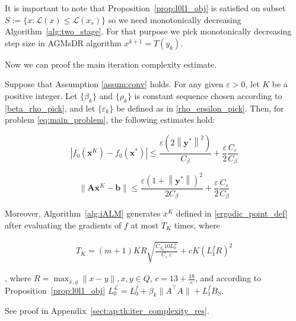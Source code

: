 \documentclass[runningheads]{llncs}
\begin{document}
	It is important to note that Proposition~\ref{prop:l0l1_obj} is satisfied on subset $S:=\{x:\mathcal{L}(x)\leq \mathcal{L}(x_s)\}$ so we need monotonically decreasing Algorithm~\ref{alg:two_stage}. For that purpose we pick monotonically decreasing step size in AGMsDR algorithm $x^{k+1} = T(y_k)$.
	
	Now we can proof the main iteration complexity estimate.
	
	\begin{theorem}\label{th:iter_complexity_res}
		Suppose that Assumption \ref{assum:conv} holds. For any given $\varepsilon>0$, let $K$ be a positive integer. Let $\{\beta_k\}$ and $\{\rho_k\}$ is constant sequence chosen according to \eqref{beta_rho_pick}, and let $\{\varepsilon_k\}$ be defined as in \eqref{rho_epsilon_pick}. Then, for problem \ref{eq:main_problem}, the following estimates hold:
		
		\begin{equation}\label{th:it_comp_f}
			\left|
			f_0\left(\overline{\mathbf{x}}^K\right)-f_0\left(\mathbf{x}^*\right)
			\right| 
			\leq \frac{\varepsilon\left(2\left\|\mathbf{y}^*\right\|^2\right)}{C_\beta}+\frac{\varepsilon}{2} \frac{C_{\varepsilon}}{C_\beta}
		\end{equation}
		
		\begin{equation}\label{th:it_comp_cnstr}
			\| \mathbf{A} \overline{\mathbf{x}}^K-\mathbf{b} \|
			\leq \frac{\varepsilon \left(1+\left\|\mathbf{y}^*\right\|\right)^2}{2 C_\beta}+\frac{\varepsilon}{2} \frac{C_{\varepsilon}}{C_\beta}
		\end{equation}
		
		Moreover, Algorithm~\ref{alg:iALM} generates $\overline{x}^K$ defined in \eqref{ergodic_point_def} after evaluating the gradients of $f$ at most $T_K$ times, where
		
		\begin{align*}
			T_K = (m+1) K R \sqrt{\frac{C_{\beta_k} 10 L_0^{\mathcal{L}} }{C_\varepsilon \ \varepsilon}} + c K (L_1^f R)^2
		\end{align*}
		
		, where $R = \max_{x, y} \| x - y \|, x, y \in Q$, $c = 13+\frac{18}{e}$, and according to Proposition~\eqref{prop:l0l1_obj} $L_0^{\mathcal{L}} = L_0^f + \beta_k\|A^\top A\| + L_1^f B_S$.
	\end{theorem}
	
	See proof in Appendix~\ref{sect:ap:th:iter_complexity_res}.
	
\end{document}
